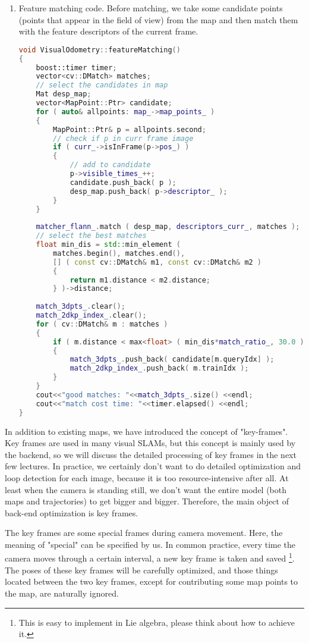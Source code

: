 \begin{enumerate}
\item Feature matching code. Before matching, we take some candidate points (points that appear in the field of view) from the map and then match them with the feature descriptors of the current frame.
\begin{lstlisting}[language=c++]
void VisualOdometry::featureMatching()
{
	boost::timer timer;
	vector<cv::DMatch> matches;
	// select the candidates in map 
	Mat desp_map;
	vector<MapPoint::Ptr> candidate;
	for ( auto& allpoints: map_->map_points_ )
	{
		MapPoint::Ptr& p = allpoints.second;
		// check if p in curr frame image 
		if ( curr_->isInFrame(p->pos_) )
		{
			// add to candidate 
			p->visible_times_++;
			candidate.push_back( p );
			desp_map.push_back( p->descriptor_ );
		}
	}
	
	matcher_flann_.match ( desp_map, descriptors_curr_, matches );
	// select the best matches
	float min_dis = std::min_element (
		matches.begin(), matches.end(),
		[] ( const cv::DMatch& m1, const cv::DMatch& m2 )
		{
			return m1.distance < m2.distance;
		} )->distance;
	
	match_3dpts_.clear();
	match_2dkp_index_.clear();
	for ( cv::DMatch& m : matches )
	{
		if ( m.distance < max<float> ( min_dis*match_ratio_, 30.0 ) )
		{
			match_3dpts_.push_back( candidate[m.queryIdx] );
			match_2dkp_index_.push_back( m.trainIdx );
		}
	}
	cout<<"good matches: "<<match_3dpts_.size() <<endl;
	cout<<"match cost time: "<<timer.elapsed() <<endl;
}
\end{lstlisting}

\end{enumerate}

In addition to existing maps, we have introduced the concept of "key-frames". Key frames are used in many visual SLAMs, but this concept is mainly used by the backend, so we will discuss the detailed processing of key frames in the next few lectures. In practice, we certainly don't want to do detailed optimization and loop detection for each image, because it is too resource-intensive after all. At least when the camera is standing still, we don't want the entire model (both maps and trajectories) to get bigger and bigger. Therefore, the main object of back-end optimization is key frames.

\clearpage
The key frames are some special frames during camera movement. Here, the meaning of "special" can be specified by us. In common practice, every time the camera moves through a certain interval, a new key frame is taken and saved \footnote{This is easy to implement in Lie algebra, please think about how to achieve it. }. The poses of these key frames will be carefully optimized, and those things located between the two key frames, except for contributing some map points to the map, are naturally ignored.

